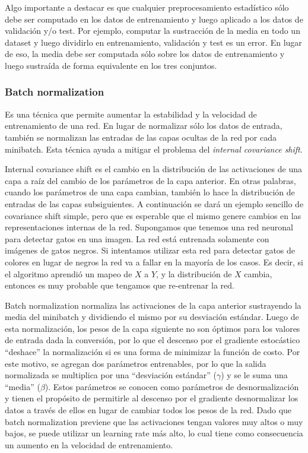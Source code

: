 \documentclass[spanish]{report}
\begin{document}
Algo importante a destacar es que cualquier preprocesamiento estadístico sólo debe ser computado en los datos de  entrenamiento y luego aplicado a los datos de validación y/o test. Por ejemplo, computar la sustracción de la media en todo un dataset y luego dividirlo en entrenamiento, validación y test es un error. En lugar de eso, la media debe ser computada sólo sobre los datos de entrenamiento y luego sustraída de forma equivalente en los tres conjuntos.

\subsubsection{Batch normalization}

Es una técnica que permite aumentar la estabilidad y la velocidad de entrenamiento de una red. En lugar de normalizar sólo los datos de entrada, también se normalizan las entradas de las capas ocultas de la red por cada minibatch. Esta técnica ayuda a mitigar el problema del \textit{internal covariance shift}. 

Internal covariance shift es el cambio en la distribución de las activaciones de una capa a raíz del cambio de los parámetros de la capa anterior. En otras palabras, cuando los parámetros de una capa cambian, también lo hace la distribución de entradas de las capas subsiguientes. A continuación se dará un ejemplo sencillo de covariance shift simple, pero que es esperable que el mismo genere cambios en las representaciones internas de la red. Supongamos que tenemos una red neuronal para detectar gatos en una imagen. La red está entrenada solamente con imágenes de gatos negros. Si intentamos utilizar esta red para detectar gatos de colores en lugar de negros la red va a fallar en la mayoría de los casos. Es decir, si el algoritmo aprendió un mapeo de $X$ a $Y$, y la distribución de $X$ cambia, entonces es muy probable que tengamos que re-entrenar la red.

Batch normalization normaliza las activaciones de la capa anterior sustrayendo la media del minibatch y dividiendo el mismo por su desviación estándar. Luego de esta normalización, los pesos de la capa siguiente no son óptimos para los valores de entrada dada la conversión, por lo que el descenso por el gradiente estocástico ``deshace'' la normalización si es una forma de minimizar la función de costo. Por este motivo, se agregan dos parámetros entrenables, por lo que la salida normalizada se multiplica por una ``desviación estándar'' ($\gamma$) y se le suma una ``media'' ($\beta$). Estos parámetros se conocen como parámetros de desnormalización y tienen el propósito de permitirle al descenso por el gradiente desnormalizar los datos a través de ellos en lugar de cambiar todos los pesos de la red.
Dado que batch normalization previene que las activaciones tengan valores muy altos o muy bajos, se puede utilizar un learning rate más alto, lo cual tiene como consecuencia un aumento en la velocidad de entrenamiento. 
\end{document}
